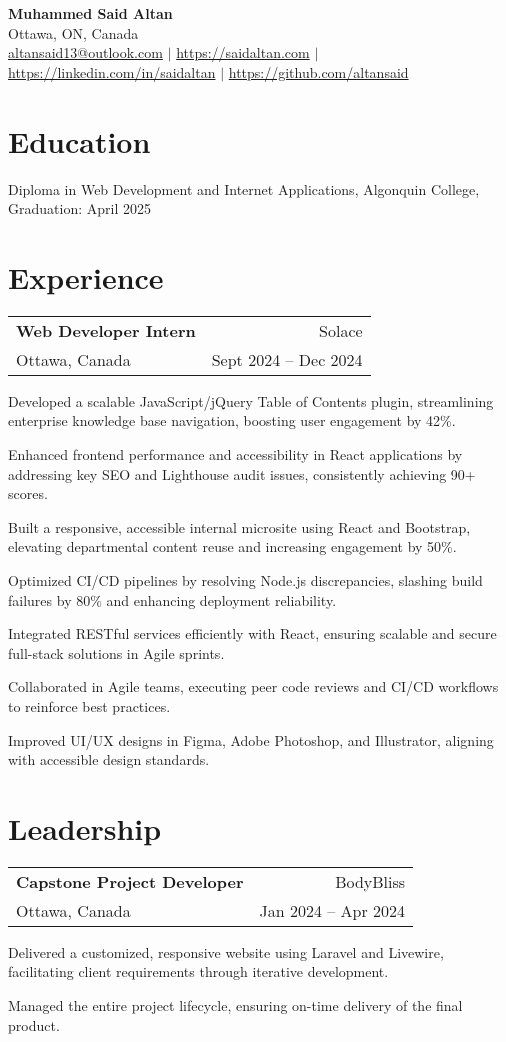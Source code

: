 \documentclass[letterpaper, 10pt]{article}
\makeatletter
\newcommand{\resumeItem}[1]{\item #1 }
\newcommand{\resumeSubheading}[4]{
  \vspace{-1pt}\item
    \begin{tabular*}{0.97\textwidth}{l@{\extracolsep{\fill}}r}
      \textbf{#1} & #2 \\
      #3 & #4 \\
    \end{tabular*}\vspace{-5pt}
}
\newcommand{\resumeEducation}[3]{\item #1, #2, #3 \vspace{-2pt}}
\makeatother
\begin{document}
\begin{center}
    \textbf{\Huge Muhammed Said Altan} \\ \vspace{2pt}
    Ottawa, ON, Canada \\ \vspace{2pt}
    \href{mailto:altansaid13@outlook.com}{altansaid13@outlook.com} $|$ 
    \url{https://saidaltan.com} $|$
    \url{https://linkedin.com/in/saidaltan} $|$
    \url{https://github.com/altansaid}
\end{center}

\section{Education}
\resumeEducation{Diploma in Web Development and Internet Applications}{Algonquin College}{Graduation: April 2025}

\section{Experience}
\resumeSubheading{Web Developer Intern}{Solace}{Ottawa, Canada}{Sept 2024 -- Dec 2024}
\resumeItemListStart
\resumeItem{Developed a scalable JavaScript/jQuery Table of Contents plugin, streamlining enterprise knowledge base navigation, boosting user engagement by 42\%.}
\resumeItem{Enhanced frontend performance and accessibility in React applications by addressing key SEO and Lighthouse audit issues, consistently achieving 90+ scores.}
\resumeItem{Built a responsive, accessible internal microsite using React and Bootstrap, elevating departmental content reuse and increasing engagement by 50\%.}
\resumeItem{Optimized CI/CD pipelines by resolving Node.js discrepancies, slashing build failures by 80\% and enhancing deployment reliability.}
\resumeItem{Integrated RESTful services efficiently with React, ensuring scalable and secure full-stack solutions in Agile sprints.}
\resumeItem{Collaborated in Agile teams, executing peer code reviews and CI/CD workflows to reinforce best practices.}
\resumeItem{Improved UI/UX designs in Figma, Adobe Photoshop, and Illustrator, aligning with accessible design standards.}
\resumeItemListEnd

\section{Leadership}
\resumeSubheading{Capstone Project Developer}{BodyBliss}{Ottawa, Canada}{Jan 2024 -- Apr 2024}
\resumeItemListStart
\resumeItem{Delivered a customized, responsive website using Laravel and Livewire, facilitating client requirements through iterative development.}
\resumeItem{Managed the entire project lifecycle, ensuring on-time delivery of the final product.}
\resumeItemListEnd
\end{document}
